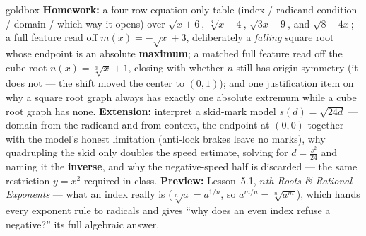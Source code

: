 \documentclass[10pt]{article}
\begin{document}
\begin{skillbox}{goldbox}
\textbf{Homework:} a four-row equation-only table (index / radicand condition / domain / which way it
opens) over $\sqrt{x+6}$, $\sqrt[3]{x-4}$, $\sqrt{3x-9}$, and $\sqrt{8-4x}$; a full feature read off
$m(x)=-\sqrt{x}+3$, deliberately a \emph{falling} square root whose endpoint is an absolute
\textbf{maximum}; a matched full feature read off the cube root $n(x)=\sqrt[3]{x}+1$, closing with
whether $n$ still has origin symmetry (it does not --- the shift moved the center to $(0,1)$); and one
justification item on why a square root graph always has exactly one absolute extremum while a cube
root graph has none. \textbf{Extension:} interpret a skid-mark model $s(d)=\sqrt{24d}$ --- domain from
the radicand and from context, the endpoint at $(0,0)$ together with the model's honest limitation
(anti-lock brakes leave no marks), why quadrupling the skid only doubles the speed estimate, solving
for $d=\frac{s^2}{24}$ and naming it the \textbf{inverse}, and why the negative-speed half is discarded
--- the same restriction $y=x^2$ required in class. \textbf{Preview:} Lesson~5.1, \emph{$n$th Roots \&
Rational Exponents} --- what an index really is ($\sqrt[n]{a}=a^{1/n}$, so $a^{m/n}=\sqrt[n]{a^m}$),
which hands every exponent rule to radicals and gives ``why does an even index refuse a negative?''
its full algebraic answer.
\end{skillbox}
\end{document}
